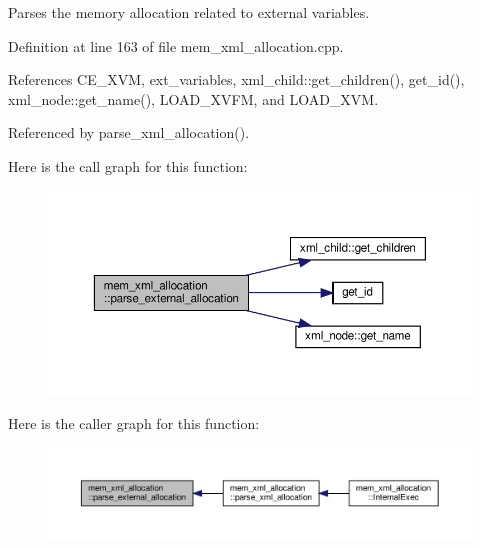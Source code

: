 Parses the memory allocation related to external variables. 



Definition at line 163 of file mem\+\_\+xml\+\_\+allocation.\+cpp.



References C\+E\+\_\+\+X\+VM, ext\+\_\+variables, xml\+\_\+child\+::get\+\_\+children(), get\+\_\+id(), xml\+\_\+node\+::get\+\_\+name(), L\+O\+A\+D\+\_\+\+X\+V\+FM, and L\+O\+A\+D\+\_\+\+X\+VM.



Referenced by parse\+\_\+xml\+\_\+allocation().

Here is the call graph for this function\+:
\nopagebreak
\begin{figure}[H]
\begin{center}
\leavevmode
\includegraphics[width=350pt]{d2/d51/classmem__xml__allocation_a07bd3a79034972bb53511ab5d17f00e6_cgraph}
\end{center}
\end{figure}
Here is the caller graph for this function\+:
\nopagebreak
\begin{figure}[H]
\begin{center}
\leavevmode
\includegraphics[width=350pt]{d2/d51/classmem__xml__allocation_a07bd3a79034972bb53511ab5d17f00e6_icgraph}
\end{center}
\end{figure}
\mbox{\label{classmem__xml__allocation_ac852d2afeb6ecf0daf13d20befcb9071}} 
